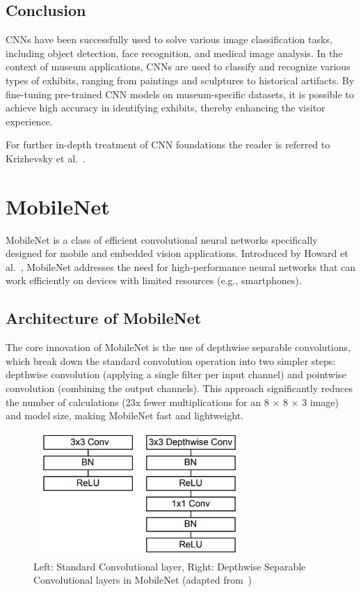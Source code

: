 \subsection{Conclusion}

CNNs have been successfully used to solve various image classification tasks, including object detection, face recognition, and medical image analysis. In the context of museum applications, CNNs are used to classify and recognize various types of exhibits, ranging from paintings and sculptures to historical artifacts. By fine-tuning pre-trained CNN models on museum-specific datasets, it is possible to achieve high accuracy in identifying exhibits, thereby enhancing the visitor experience.

For further in-depth treatment of CNN foundations the reader is referred to Krizhevsky et al.~\cite{krizhevsky_imagenet}.

\section{MobileNet}\label{section:mobilenet}

MobileNet is a class of efficient convolutional neural networks specifically designed for mobile and embedded vision applications. Introduced by Howard et al.~\cite{howard_mobilenet}, MobileNet addresses the need for high-performance neural networks that can work efficiently on devices with limited resources (e.g., smartphones).

\subsection{Architecture of MobileNet}

The core innovation of MobileNet is the use of depthwise separable convolutions, which break down the standard convolution operation into two simpler steps: depthwise convolution (applying a single filter per input channel) and pointwise convolution (combining the output channels). This approach significantly reduces the number of calculations (23x fewer multiplications for an 8 $\times$ 8 $\times$ 3 image) and model size, making MobileNet fast and lightweight.

\begin{figure}[h]
    \centering
    \includegraphics[width=0.7\textwidth]{img/mobilenet.png}
    \caption{Left: Standard Convolutional layer, Right: Depthwise Separable Convolutional layers in MobileNet (adapted from~\cite{howard_mobilenet})}\label{fig:mobilenet}
\end{figure}

